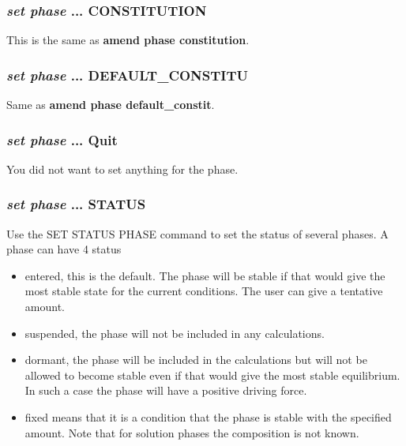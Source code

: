 \documentclass[12pt]{article}
\begin{document}
\subsubsection{{\em set phase} ... CONSTITUTION}

This is the same as {\bf amend phase constitution}.

\subsubsection{{\em set phase} ... DEFAULT\_CONSTITU}

Same as {\bf amend phase default\_constit}.

\subsubsection{{\em set phase} ... Quit}

You did not want to set anything for the phase.

\subsubsection{{\em set phase} ... STATUS}

Use the SET STATUS PHASE command to set the status of several phases.
A phase can have 4 status

\begin{itemize}
\item entered, this is the default.  The phase will be stable if that
would give the most stable state for the current conditions.  The user
can give a tentative amount.
\item suspended, the phase will not be included in any calculations.
\item dormant, the phase will be included in the calculations but will
not be allowed to become stable even if that would give the most
stable equilibrium.  In such a case the phase will have a positive
driving force.
\item fixed means that it is a condition that the phase is stable with
the specified amount.  Note that for solution phases the composition
is not known.
\end{itemize}
\end{document}
